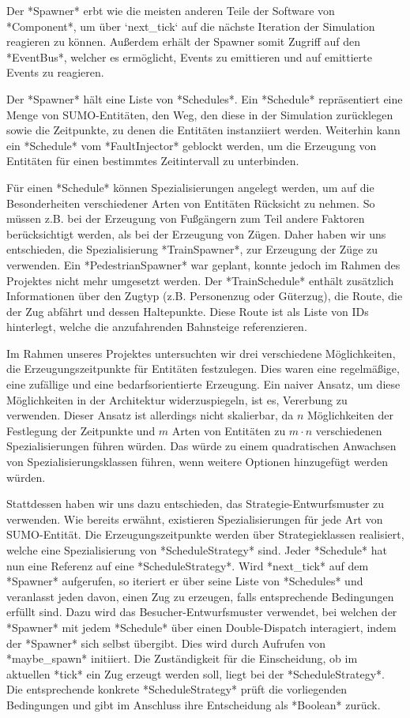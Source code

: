 Der *Spawner* erbt wie die meisten anderen Teile der Software von *Component*, um über `next\_tick` auf die nächste Iteration der Simulation reagieren zu können. Außerdem erhält der Spawner somit Zugriff auf den *EventBus*, welcher es ermöglicht, Events zu emittieren und auf emittierte Events zu reagieren. 

Der *Spawner* hält eine Liste von *Schedules*. Ein *Schedule* repräsentiert eine Menge von SUMO-Entitäten, den Weg, den diese in der Simulation zurücklegen sowie die Zeitpunkte, zu denen die Entitäten instanziiert werden. Weiterhin kann ein *Schedule* vom *FaultInjector* geblockt werden, um die Erzeugung von Entitäten für einen bestimmtes Zeitintervall zu unterbinden. 

Für einen *Schedule* können Spezialisierungen angelegt werden, um auf die Besonderheiten verschiedener Arten von Entitäten Rücksicht zu nehmen. So müssen z.B. bei der Erzeugung von Fußgängern zum Teil andere Faktoren berücksichtigt werden, als bei der Erzeugung von Zügen. Daher haben wir uns entschieden, die Spezialisierung *TrainSpawner*, zur Erzeugung der Züge zu verwenden. Ein *PedestrianSpawner* war geplant, konnte jedoch im Rahmen des Projektes nicht mehr umgesetzt werden. Der *TrainSchedule* enthält zusätzlich Informationen über den Zugtyp (z.B. Personenzug oder Güterzug), die Route, die der Zug abfährt und dessen Haltepunkte. Diese Route ist als Liste von IDs hinterlegt, welche die anzufahrenden Bahnsteige referenzieren.

Im Rahmen unseres Projektes untersuchten wir drei verschiedene Möglichkeiten, die Erzeugungszeitpunkte für Entitäten festzulegen. Dies waren eine regelmäßige, eine zufällige und eine bedarfsorientierte Erzeugung. Ein naiver Ansatz, um diese Möglichkeiten in der Architektur widerzuspiegeln, ist es, Vererbung zu verwenden. Dieser Ansatz ist allerdings nicht skalierbar, da $n$ Möglichkeiten der Festlegung der Zeitpunkte und $m$ Arten von Entitäten zu $m\cdot n$ verschiedenen Spezialisierungen führen würden. Das würde zu einem quadratischen Anwachsen von Spezialisierungsklassen führen, wenn weitere Optionen hinzugefügt werden würden.

Stattdessen haben wir uns dazu entschieden, das Strategie-Entwurfsmuster zu verwenden. Wie bereits erwähnt, existieren Spezialisierungen für jede Art von SUMO-Entität. Die Erzeugungszeitpunkte werden über Strategieklassen realisiert, welche eine Spezialisierung von *ScheduleStrategy* sind. Jeder *Schedule* hat nun eine Referenz auf eine *ScheduleStrategy*. Wird *next\_tick* auf dem *Spawner* aufgerufen, so iteriert er über seine Liste von *Schedules* und veranlasst jeden davon, einen Zug zu erzeugen, falls entsprechende Bedingungen erfüllt sind. Dazu wird das Besucher-Entwurfsmuster verwendet, bei welchen der *Spawner* mit jedem *Schedule* über einen Double-Dispatch interagiert, indem der *Spawner* sich selbst übergibt. Dies wird durch Aufrufen von *maybe\_spawn* initiiert. Die Zuständigkeit für die Einscheidung, ob im aktuellen *tick* ein Zug erzeugt werden soll, liegt bei der *ScheduleStrategy*. Die entsprechende konkrete *ScheduleStrategy* prüft die vorliegenden Bedingungen und gibt im Anschluss ihre Entscheidung als *Boolean* zurück.

